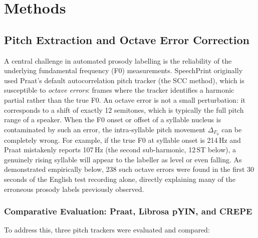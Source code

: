 
\chapter{Methods}
\label{methods}

\section{Pitch Extraction and Octave Error Correction}
\label{sec:pitch_extraction}

A central challenge in automated prosody labelling is the reliability of the
underlying fundamental frequency (F0) measurements. SpeechPrint originally used
Praat's default autocorrelation pitch tracker (the SCC method), which is
susceptible to \emph{octave errors}: frames where the tracker identifies a
harmonic partial rather than the true F0. An octave error is not a small
perturbation: it corresponds to a shift of exactly 12 semitones, which is
typically the full pitch range of a speaker. When the F0 onset or offset of a
syllable nucleus is contaminated by such an error, the intra-syllable pitch
movement $\Delta_{F_0}$ can be completely wrong. For example, if the true F0 at
syllable onset is 214\,Hz and Praat mistakenly reports 107\,Hz (the second
sub-harmonic, 12\,ST below), a genuinely rising syllable will appear to the
labeller as level or even falling. As demonstrated empirically below, 238 such
octave errors were found in the first 30 seconds of the English test recording
alone, directly explaining many of the erroneous prosody labels previously
observed.

\subsection{Comparative Evaluation: Praat, Librosa pYIN, and CREPE}
\label{sec:tracker_comparison}

To address this, three pitch trackers were evaluated and compared:

